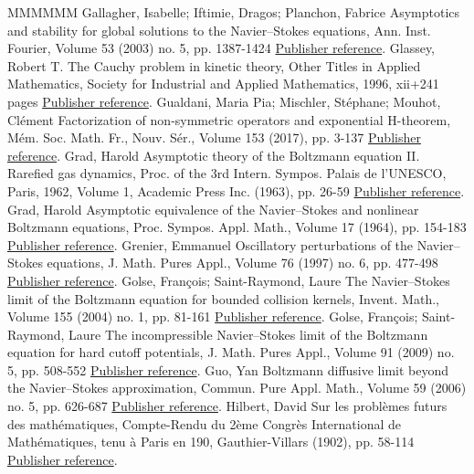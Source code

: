 \begin{thebibliography}{MMMMMM}
 Gallagher, Isabelle; Iftimie, Dragos; Planchon, Fabrice Asymptotics and stability for global solutions to the Navier–Stokes equations, Ann. Inst. Fourier, Volume 53 (2003) no. 5, pp. 1387-1424 \href{https://ahl.centre-mersenne.org/item/AHL_2020__3__561_0/#GIP}{Publisher reference}.
 Glassey, Robert T. The Cauchy problem in kinetic theory, Other Titles in Applied Mathematics, Society for Industrial and Applied Mathematics, 1996, xii+241 pages \href{https://ahl.centre-mersenne.org/item/AHL_2020__3__561_0/#Glassey}{Publisher reference}.
 Gualdani, Maria Pia; Mischler, Stéphane; Mouhot, Clément Factorization of non-symmetric operators and exponential H-theorem, Mém. Soc. Math. Fr., Nouv. Sér., Volume 153 (2017), pp. 3-137 \href{https://ahl.centre-mersenne.org/item/AHL_2020__3__561_0/#GMM}{Publisher reference}.
 Grad, Harold Asymptotic theory of the Boltzmann equation II. Rarefied gas dynamics, Proc. of the 3rd Intern. Sympos. Palais de l’UNESCO, Paris, 1962, Volume 1, Academic Press Inc. (1963), pp. 26-59 \href{https://ahl.centre-mersenne.org/item/AHL_2020__3__561_0/#Gradhydro}{Publisher reference}.
 Grad, Harold Asymptotic equivalence of the Navier–Stokes and nonlinear Boltzmann equations, Proc. Sympos. Appl. Math., Volume 17 (1964), pp. 154-183 \href{https://ahl.centre-mersenne.org/item/AHL_2020__3__561_0/#Grad}{Publisher reference}.
 Grenier, Emmanuel Oscillatory perturbations of the Navier–Stokes equations, J. Math. Pures Appl., Volume 76 (1997) no. 6, pp. 477-498 \href{https://ahl.centre-mersenne.org/item/AHL_2020__3__561_0/#Grenier}{Publisher reference}.
 Golse, François; Saint-Raymond, Laure The Navier–Stokes limit of the Boltzmann equation for bounded collision kernels, Invent. Math., Volume 155 (2004) no. 1, pp. 81-161 \href{https://ahl.centre-mersenne.org/item/AHL_2020__3__561_0/#GSR1}{Publisher reference}.
 Golse, François; Saint-Raymond, Laure The incompressible Navier–Stokes limit of the Boltzmann equation for hard cutoff potentials, J. Math. Pures Appl., Volume 91 (2009) no. 5, pp. 508-552 \href{https://ahl.centre-mersenne.org/item/AHL_2020__3__561_0/#GSR2}{Publisher reference}.
 Guo, Yan Boltzmann diffusive limit beyond the Navier–Stokes approximation, Commun. Pure Appl. Math., Volume 59 (2006) no. 5, pp. 626-687 \href{https://ahl.centre-mersenne.org/item/AHL_2020__3__561_0/#Guo}{Publisher reference}.
 Hilbert, David Sur les problèmes futurs des mathématiques, Compte-Rendu du 2ème Congrès International de Mathématiques, tenu à Paris en 190, Gauthier-Villars (1902), pp. 58-114 \href{https://ahl.centre-mersenne.org/item/AHL_2020__3__561_0/#Hilbert}{Publisher reference}.

\end{thebibliography}

